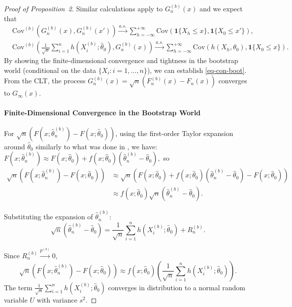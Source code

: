\documentclass[12pt]{article}
\begin{document}
\begin{proof}[Proof of Proposition~2]
Similar calculations apply 
to $G_n^{(b)}(x)$ and we expect that
\begin{align*}
&\text{Cov}^{(b)}(G_n^{(b)}(x),G_n^{(b)}(x'))\overset{a.s.}{\rightarrow}   
\sum^{+\infty}_{h=-\infty}
\text{Cov}(\mathbf{1}\{X_{h}\leq x\},\mathbf{1}\{X_0\leq x'\}),\\
&\text{Cov}^{(b)}\left(\frac{1}{\sqrt{n}}\sum^{n}_{i=1}h(X_i^{(b)};
\hat{\theta}_0), G_n^{(b)}(x)\right)\overset{a.s.}{\rightarrow} 
\sum^{+\infty}_{h=-\infty}\text{Cov}(h(X_{h},\theta_0),\mathbf{1}\{X_0\leq x\}).
\end{align*}
By showing the finite-dimensional convergence and tightness in the bootstrap 
world (conditional on the data $\{X_i: i = 1, \ldots, n\}$), we can establish 
\eqref{eq-con-boot}.
From the CLT, the process $G_n^{(b)}(x) = \sqrt{n}(F_n^{(b)}(x) - F_n(x))$ 
converges  to $G_{\infty}(x)$.

\paragraph{Finite-Dimensional Convergence in the Bootstrap World}

For $\sqrt{n}(F(x;\hat{\theta}_n^{(b)}) - F(x;\hat{\theta}_0))$, using the 
first-order Taylor 
expansion around $\hat{\theta}_0$ similarly to what was done in 
\citet{kunsch1989jackknife}, we have:
$
F(x;\hat{\theta}_n^{(b)}) \approx F(x;\hat{\theta}_0) + f(x; 
\hat{\theta}_0) (\hat{\theta}_n^{(b)} - \hat{\theta}_0),
$ so
\begin{align*}
  \sqrt{n}(F(x;\hat{\theta}_n^{(b)}) - F(x;\hat{\theta}_0))
  &\approx \sqrt{n} (F(x;\hat{\theta}_0) +
  f(x; \hat{\theta}_0) (\hat{\theta}_n^{(b)} - \hat{\theta}_0) - F(x;\hat{\theta}_0)) \\
  &\approx  f(x; \hat{\theta}_0) \sqrt{n} (\hat{\theta}_n^{(b)} - \hat{\theta}_0).
\end{align*}


Substituting the expansion of $\hat{\theta}_n^{(b)}$:
\[
\sqrt{n} (\hat{\theta}_n^{(b)} - \hat{\theta}_0) = \frac{1}{\sqrt{n}} 
\sum_{i=1}^{n} 
h(X_i^{(b)}; \hat{\theta}_0) + R_n^{(b)}.
\]

Since $R_n^{(b)} \overset{p^{(b)}}{\rightarrow} 0$, 
\[
\sqrt{n}(F(x;\hat{\theta}_n^{(b)}) - F(x;\hat{\theta}_0)) \approx 
f(x; \hat{\theta}_0) \left( \frac{1}{\sqrt{n}} \sum_{i=1}^{n} h(X_i^{(b)}; 
\hat{\theta}_0) \right).
\]
The term $\frac{1}{\sqrt{n}} \sum_{i=1}^{n} h(X_i^{(b)}; \hat{\theta}_0)$ 
converges in distribution to a normal random variable $U$ with variance 
$s^2$.



\end{proof}
\end{document}
